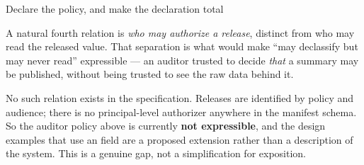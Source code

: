 \begin{step}{Declare the policy, and make the declaration total}{%
}
\begin{remark}
\label{rem:authorizers}
A natural fourth relation is \emph{who may authorize a release}, distinct from
who may read the released value. That separation is what would make ``may
declassify but may never read'' expressible --- an auditor trusted to decide
\emph{that} a summary may be published, without being trusted to see the raw
data behind it.

No such relation exists in the specification. Releases are identified by policy
and audience; there is no principal-level authorizer anywhere in the manifest
schema. So the auditor policy above is currently \textbf{not expressible}, and
the design examples that use an  field are a proposed
extension rather than a description of the system. This is a genuine gap, not a
simplification for exposition.
\end{remark}
\end{step}

